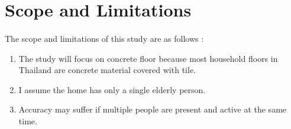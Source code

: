 \section{Scope and Limitations}
\paragraph{}
The scope and limitations of this study are as follows :
\begin{enumerate}
\item The study will focus on concrete floor because most household floors in Thailand are concrete material covered with tile.
\item I assume the home has only a single elderly person.
\item Accuracy may suffer if multiple people are present and active at the same time.
\end{enumerate} 